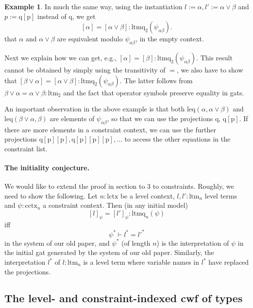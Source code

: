 \documentclass[11pt,a4paper]{article}
\theoremstyle{definition}
\newtheorem{example}{Example}
\newtheorem{conjecture}{Conjecture}
\def\psiab{\psi_{\alpha\beta}}
\def\lctx{\mathrm{lctx}}
\def\ltm{\mathrm{ltm}}
\def\ltmq{\mathrm{ltmq}}
\def\leq{\mathrm{leq}}
\def\cctx{\mathrm{cctx}}
\def\ctm{\mathrm{ctm}}
\def\p{\mathrm{p}}
\def\q{\mathrm{q}}
\begin{document}
\begin{example}
In much the same way, using the instantiation $l := \alpha,
l' := \alpha\vee\beta$ and $p := \q[\p]$ instead of $\q$, we get
\[
[\alpha]=[\alpha\vee\beta] : \ltmq_2(\psiab).
\]
that $\alpha$ and $\alpha\vee\beta$ are equivalent modulo $\psiab$, 
in the empty context.

Next we explain how we can get, e.g.,
$
[\alpha] = [\beta] : \ltmq_2(\psiab).
$
This result cannot be obtained by simply using the transitivity of $=$,
we also have to show that
$
[\beta\vee\alpha]=[\alpha\vee\beta] : \ltmq_2(\psiab).
$
The latter follows from 
$
\beta\vee\alpha=\alpha\vee\beta : \ltm_2$ and the fact that operator symbols preserve equality in gats.
\end{example}


An important observation in the above example is that
both $\leq(\alpha,\alpha\vee\beta)$ and $\leq(\beta\vee\alpha,\beta)$
are elements of $\psiab$, so that we can use the projections $\q$, $\q[\p]$. If there
are more elements in a constraint context, we can use the further projections $\q[\p][\p], \q[\p][\p][\p], \ldots$
to access the other equations in the constraint list.

\paragraph{The initiality conjecture.} We would like to extend the proof in section to 3 to constraints. Roughly, we need to show the following.
Let $n:\lctx$ be a level context, $l,l':\ltm_n$ level terms and 
$\psi:\cctx_n$ a constraint context. Then (in any initial model)
$$
[l]_\psi = [l']_\psi  : \ltmq_n(\psi)
$$
iff
$$
\psi^* \vdash l^* = l'^*
$$
in the system of our old paper, and $\psi^*$ (of length $n$) is the interpretation of $\psi$ in the initial gat generated by the system of our old paper. Similarly, the interpretation $l^*$ of $l : \ltm_n$ is a level term where variable names in $l^*$ have replaced the projections.

\subsection{The level- and constraint-indexed cwf of types}
\end{document}
